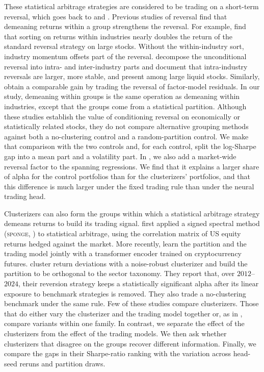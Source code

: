These statistical arbitrage strategies are considered to be trading on a short-term reversal, which goes back to \citet{jegadeesh1990evidence} and \citet{lehmann1990fads}. Previous studies of reversal find that demeaning returns within a group strengthens the reversal. For example, \citet{da2014closer} find that sorting on returns within industries nearly doubles the return of the standard reversal strategy on large stocks. Without the within-industry sort, industry momentum offsets part of the reversal. \citet{hameed2015industries} decompose the unconditional reversal into intra- and inter-industry parts and document that intra-industry reversals are larger, more stable, and present among large liquid stocks. Similarly, \citet{blitz2013residual} obtain a comparable gain by trading the reversal of factor-model residuals. In our study, demeaning within groups is the same operation as demeaning within industries, except that the groups come from a statistical partition. Although these studies establish the value of conditioning reversal on economically or statistically related stocks, they do not compare alternative grouping methods against both a no-clustering control and a random-partition control. We make that comparison with the two controls and, for each control, split the log-Sharpe gap into a mean part and a volatility part. In , we also add a market-wide reversal factor to the spanning regressions. We find that it explains a larger share of alpha for the control portfolios than for the clusterizers' portfolios, and that this difference is much larger under the fixed trading rule than under the neural trading head.

Clusterizers can also form the groups within which a statistical arbitrage strategy demeans returns to build its trading signal. \citet{Jinetal2023} first applied a signed spectral
method (\textsc{sponge}, \citealp{cucuringu2019sponge}) to statistical
arbitrage, using the correlation matrix of US equity returns hedged against the market.
More recently, \citet{LeeChang2026} learn the partition and the trading model jointly with a transformer encoder trained on cryptocurrency
futures. \citet{brutti2026orthogonal} cluster return deviations with a noise-robust clusterizer and build the partition to be orthogonal to the sector taxonomy. They report that, over
$2012$--$2024$, their reversion strategy keeps a statistically significant alpha after its linear exposure to benchmark strategies is removed. They also trade a no-clustering benchmark under the same rule. Few of these studies compare clusterizers. Those that do either vary the clusterizer and the trading model together or, as in \citet{Jinetal2023}, compare variants within one family. In contrast, we separate the effect of the clusterizers from the effect of the trading models. We then ask whether clusterizers that disagree on the groups recover different information. Finally, we compare the gaps in their Sharpe-ratio ranking with the variation across head-seed reruns and partition draws.